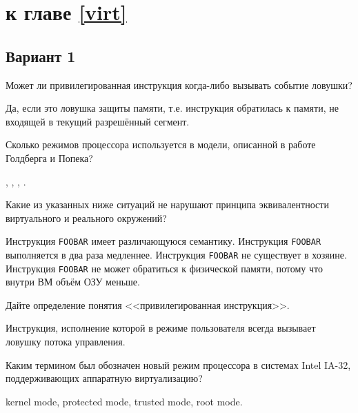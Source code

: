 
\section{\Questions к главе \ref{virt}} %

\subsection*{Вариант 1}

\begin{questions}
\question[3] Может ли привилегированная инструкция когда-либо вызывать событие ловушки?
\begin{solution}[1cm]
Да, если это ловушка защиты памяти, т.е. инструкция обратилась к памяти, не входящей в текущий разрешённый сегмент.
\end{solution}

\question[1] Сколько режимов процессора используется в модели, описанной в работе Голдберга и Попека?
\begin{choices}
    ,
    ,
    ,
    .
\end{choices}

\question[3] Какие из указанных ниже ситуаций не нарушают принципа эквивалентности виртуального и реального окружений?
\begin{choices}
    \choice Инструкция \texttt{FOOBAR} имеет различающуюся семантику.
    \correctchoice Инструкция \texttt{FOOBAR} выполняется в два раза медленнее.
    \choice Инструкция \texttt{FOOBAR} не существует в хозяине.
    \correctchoice Инструкция \texttt{FOOBAR} не может обратиться к физической памяти, потому что внутри ВМ объём ОЗУ меньше.
\end{choices}

\question[3] Дайте определение понятия <<привилегированная инструкция>>.
\begin{solution}[1cm]
Инструкция, исполнение которой в режиме пользователя всегда вызывает ловушку потока управления.
\end{solution}

\question[3] Каким термином был обозначен новый режим процессора в системах Intel IA-32, поддерживающих аппаратную виртуализацию?
\begin{choices}
    \choice kernel mode,
    \choice protected mode,
    \choice trusted mode,
    \correctchoice root mode.
\end{choices}


\end{questions}
